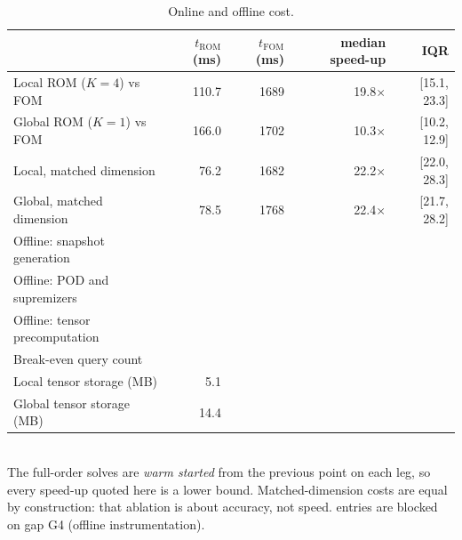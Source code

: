 \begin{table}[tb]
  \centering
  \caption{Online and offline cost.}
  \label{tab:cost}
  \begin{tabular}{lrrrr}
    \toprule
     & $t_{\mathrm{ROM}}$ (ms) & $t_{\mathrm{FOM}}$ (ms) & median speed-up & IQR \\
    \midrule
    Local ROM ($K=4$) vs FOM & 110.7 & 1689 & 19.8$\times$ & [15.1, 23.3] \\
    Global ROM ($K=1$) vs FOM & 166.0 & 1702 & 10.3$\times$ & [10.2, 12.9] \\
    Local, matched dimension & 76.2 & 1682 & 22.2$\times$ & [22.0, 28.3] \\
    Global, matched dimension & 78.5 & 1768 & 22.4$\times$ & [21.7, 28.2] \\
    Offline: snapshot generation & \CHECK{} & \CHECK{} &  &  \\
    Offline: POD and supremizers & \CHECK{} & \CHECK{} &  &  \\
    Offline: tensor precomputation & \CHECK{} & \CHECK{} &  &  \\
    Break-even query count & \CHECK{} &  &  &  \\
    Local tensor storage (MB) & 5.1 &  &  &  \\
    Global tensor storage (MB) & 14.4 &  &  &  \\
    \bottomrule
  \end{tabular}
  \\[2pt] \footnotesize The full-order solves are \emph{warm started} from the previous point on each leg, so every speed-up quoted here is a lower bound. Matched-dimension costs are equal by construction: that ablation is about accuracy, not speed. \CHECK{} entries are blocked on gap G4 (offline instrumentation).
\end{table}
